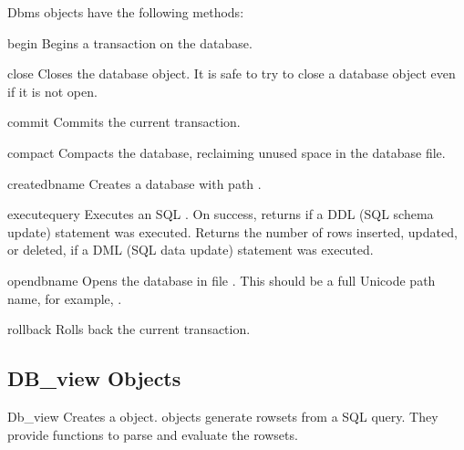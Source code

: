 Dbms objects have the following methods:

\begin{methoddesc}[Dbms]{begin}{}
Begins a transaction on the database.
\end{methoddesc}

\begin{methoddesc}[Dbms]{close}{}
Closes the database object. It is safe to try to close a database object 
even if it is not open.
\end{methoddesc}

\begin{methoddesc}[Dbms]{commit}{}
Commits the current transaction.
\end{methoddesc}

\begin{methoddesc}[Dbms]{compact}{}
Compacts the database, reclaiming unused space in the database file. 
\end{methoddesc}

\begin{methoddesc}[Dbms]{create}{dbname}
Creates a database with path .
\end{methoddesc}

\begin{methoddesc}[Dbms]{execute}{query}
Executes an SQL . On success, returns  if a DDL
(SQL schema update) statement was executed. Returns the number of rows
inserted, updated, or deleted, if a DML (SQL data update) statement
was executed.
\end{methoddesc}

\begin{methoddesc}[Dbms]{open}{dbname}
Opens the database in file . This should be a full 
Unicode path name, for example, .
\end{methoddesc}

\begin{methoddesc}[Dbms]{rollback}{}
Rolls back the current transaction.
\end{methoddesc}

\subsection{DB_view Objects}
\label{subsec:mylabel14}

\begin{classdesc}{Db_view}{}
Creates a  object.  objects generate 
rowsets from a SQL query. They provide functions to parse and evaluate the 
rowsets.
\end{classdesc}


